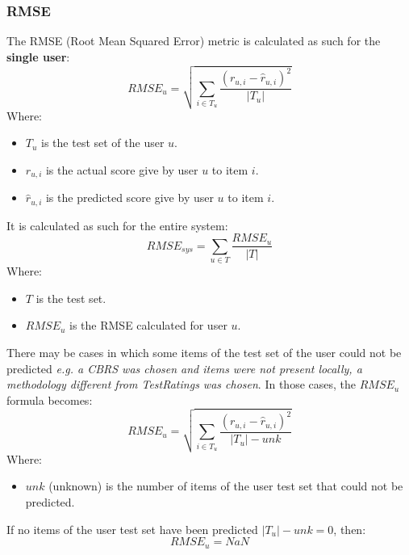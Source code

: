 \documentclass[11pt]{article}
\begin{document}
\subsubsection{RMSE}\label{subsubsec:rmse}
The RMSE (Root Mean Squared Error) metric is calculated as such for the \textbf{single user}:
\hfill\break
\hfill\break
    \[
        RMSE_u = \sqrt{\sum_{i \in T_u} \frac{(r_{u,i} - \hat{r}_{u,i})^2}{|T_u|}}
    \]
\hfill\break
\hfill\break
    Where:
\begin{itemize}
    \item $T_u$ is the test set of the user $u$.
    \item $r_{u, i}$ is the actual score give by user $u$ to item $i$.
    \item $\hat{r}_{u, i}$ is the predicted score give by user $u$ to item $i$.
\end{itemize}
\hfill\break
\hfill\break
It is calculated as such for the entire system:
\hfill\break
\hfill\break
    \[
        RMSE_{sys} = \sum_{u \in T} \frac{RMSE_u}{|T|}
    \]
\hfill\break
\hfill\break
    Where:
\begin{itemize}
    \item $T$ is the test set.
    \item $RMSE_u$ is the RMSE calculated for user $u$.
\end{itemize}
\hfill\break
\hfill\break
There may be cases in which some items of the test set of the user could not be predicted
\textit{e.g. a CBRS was chosen and items were not present locally, a methodology different from TestRatings was chosen}.
In those cases, the $RMSE_u$ formula becomes:
\hfill\break
\hfill\break
    \[
        RMSE_u = \sqrt{\sum_{i \in T_u} \frac{(r_{u,i} - \hat{r}_{u,i})^2}{|T_u| - unk}}
    \]
\hfill\break
\hfill\break
    Where:
\begin{itemize}
    \item $unk$ (unknown) is the number of items of the user test set that could not be predicted.
\end{itemize}
\hfill\break
\hfill\break
If no items of the user test set have been predicted $|T_u| - unk = 0$, then:
\hfill\break
\hfill\break
    \[
        RMSE_u = NaN
    \]
\hfill\break
\hfill\break

\end{document}

